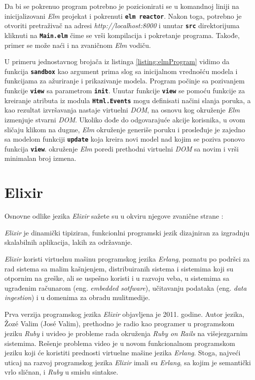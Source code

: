 \documentclass[12pt,oneside]{memoir}
\begin{document}
Da bi se pokrenuo program potrebno je pozicionirati se u komandnoj liniji na inicijalizovani
\emph{Elm} projekat i pokrenuti \texttt{\textbf{elm reactor}}. Nakon toga, potrebno je otvoriti pretraživač na
adresi \emph{http://localhost:8000} i unutar \texttt{\textbf{src}} direktorijuma kliknuti na 
\texttt{\textbf{Main.elm}} čime se vrši kompilacija i pokretanje programa. Takođe, primer se
može naći i na zvaničnom \emph{Elm} vodiču\cite{elm-program}.

U primeru jednostavnog brojača iz listinga \ref{listing:elmProgram} vidimo da funkcija
\textbf{\texttt{sandbox}} kao argument prima slog sa inicijalnom vrednošću modela i 
funkcijama za ažuriranje i prikazivanje modela. Program počinje sa pozivanjem funkcije
\texttt{\textbf{view}} sa parametrom \texttt{\textbf{init}}. Unutar funkcije
\texttt{\textbf{view}} se pomoću funkcije za kreiranje atributa iz modula
\texttt{\textbf{Html.Events}} mogu definisati načini slanja poruka, a kao rezultat 
izvršavanja nastaje virtuelni \emph{DOM}, na osnovu kog okruženje \emph{Elm} izmenjuje stvarni \emph{DOM}.
Ukoliko dođe do odgovarajuće akcije korisnika, u ovom sličaju klikom na dugme, \emph{Elm} okruženje
generiše poruku i prosleđuje je zajedno sa modelom funkciji \texttt{\textbf{update}} koja
kreira novi model nad kojim se poziva ponovo funkcija \texttt{\textbf{view}}.
okruženje \emph{Elm} poredi prethodni virtuelni \emph{DOM} sa novim i vrši minimalan broj izmena.  

\chapter{Elixir}
Osnovne odlike jezika \emph{Elixir} sažete su u okviru njegove zvanične strane \cite{elixir}:
\begin{displayquote}
\emph{Elixir} je dinamički tipiziran, funkcionlni programski jezik dizajniran za izgradnju skalabilnih
aplikacija, lakih za održavanje.

\emph{Elixir} koristi virtuelnu mašinu programskog jezika \emph{Erlang}, poznatu po podršci za rad sistema sa malim kašnjenjem,
distribuiranih sistema i sistemima koji su otpornim na greške, ali se uspešno koristi i u razvoju
veba, u sistemima sa ugrađenim računarom (eng. \emph{embedded sotfware}), učitavanju podataka
(eng. \emph{data ingestion}) i u domenima za obradu mulitmedije.
\end{displayquote}

Prva verzija programskog jezika \emph{Elixir} objavljena je 2011. godine. Autor jezika, Žozé Valim
(José Valim), prethodno je radio kao programer u programskom jeziku \emph{Ruby} i uvideo je probleme rada
okruženja \emph{Ruby on Rails} na višejezgarnim sistemima. Rešenje problema video je u novom funkcionalnom
programskom jeziku koji će koristiti prednosti virtuelne mašine jezika \emph{Erlang}. Stoga, najveći
uticaj na razvoj programskog jezika \emph{Elixir} imali su \emph{Erlang}, sa kojim je semantički vrlo sličnan,
i \emph{Ruby} u smislu sintakse. 
\end{document}
